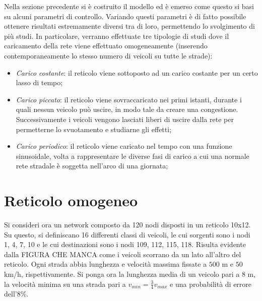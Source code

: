 \documentclass[../main.tex]{subfiles}
\begin{document}
Nella sezione precedente si \`e costruito il modello ed \`e emerso come questo si basi su alcuni parametri di controllo.
Variando questi parametri \`e di fatto possibile ottenere risultati estremamente diversi tra di loro, permettendo lo svolgimento di pi\`u studi.
In particolare, verranno effettuate tre tipologie di studi dove il caricamento della rete viene effettuato omogeneamente (inserendo contemporaneamente lo stesso numero di veicoli su tutte le strade):
\begin{itemize}
    \item \emph{Carico costante}: il reticolo viene sottoposto ad un carico costante per un certo lasso di tempo;
    \item \emph{Carico piccato}: il reticolo viene sovraccaricato nei primi istanti, durante i quali nessun veicolo pu\`o uscire, in modo tale da creare una congestione. Successivamente i veicoli vengono lasciati liberi di uscire dalla rete per permetterne lo svuotamento e studiarne gli effetti;
    \item \emph{Carico periodico}: il reticolo viene caricato nel tempo con una funzione sinusoidale, volta a rappresentare le diverse fasi di carico a cui una normale rete stradale \`e soggetta nell'arco di una giornata;
\end{itemize}

\section{Reticolo omogeneo}
Si consideri ora un network composto da 120 nodi disposti in un reticolo 10x12.
Su questo, si definiscano 16 differenti classi di veicoli, le cui sorgenti sono i nodi 1, 4, 7, 10 e le cui destinazioni sono i nodi 109, 112, 115, 118.
Risulta evidente dalla FIGURA CHE MANCA come i veicoli scorrano da un lato all'altro del reticolo.
Ogni strada abbia lunghezza e velocit\`a massima fissate a $500$ m e $50$ km/h, rispettivamente.
Si ponga ora la lunghezza media di un veicolo pari a 8 m, la velocit\`a minima su una strada pari a $v_{min}=\frac{3}{4}v_{max}$ e una probabilit\`a di errore dell'8\%.
\end{document}
